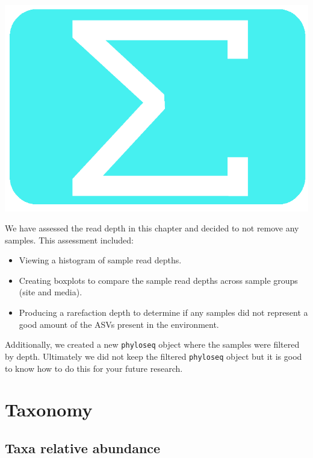 \documentclass[
]{book}
\providecommand{\tightlist}{%
  \setlength{\itemsep}{0pt}\setlength{\parskip}{0pt}}
\begin{document}
\includegraphics{figures/sum_blue.png}

We have assessed the read depth in this chapter and decided to not remove any samples.
This assessment included:

\begin{itemize}
\tightlist
\item
  Viewing a histogram of sample read depths.
\item
  Creating boxplots to compare the sample read depths across sample groups (site and media).
\item
  Producing a rarefaction depth to determine if any samples did not represent a good amount of the ASVs present in the environment.
\end{itemize}

Additionally, we created a new \texttt{phyloseq} object where the samples were filtered by depth.
Ultimately we did not keep the filtered \texttt{phyloseq} object but it is good to know how to do this for your future research.

\hypertarget{part-taxonomy}{%
\part*{Taxonomy}\label{part-taxonomy}}

\hypertarget{taxa_relabund_chap}{%
\chapter{Taxa relative abundance}\label{taxa_relabund_chap}}
\end{document}

